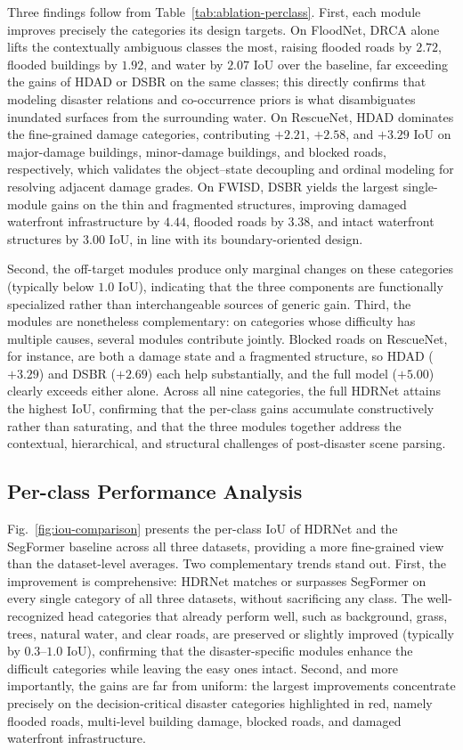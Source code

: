 \documentclass[lettersize,journal]{IEEEtran}
\begin{document}
Three findings follow from Table~\ref{tab:ablation-perclass}. First, each module improves precisely the categories its design targets. On FloodNet, DRCA alone lifts the contextually ambiguous classes the most, raising flooded roads by $2.72$, flooded buildings by $1.92$, and water by $2.07$ IoU over the baseline, far exceeding the gains of HDAD or DSBR on the same classes; this directly confirms that modeling disaster relations and co-occurrence priors is what disambiguates inundated surfaces from the surrounding water. On RescueNet, HDAD dominates the fine-grained damage categories, contributing $+2.21$, $+2.58$, and $+3.29$ IoU on major-damage buildings, minor-damage buildings, and blocked roads, respectively, which validates the object--state decoupling and ordinal modeling for resolving adjacent damage grades. On FWISD, DSBR yields the largest single-module gains on the thin and fragmented structures, improving damaged waterfront infrastructure by $4.44$, flooded roads by $3.38$, and intact waterfront structures by $3.00$ IoU, in line with its boundary-oriented design.

Second, the off-target modules produce only marginal changes on these categories (typically below $1.0$ IoU), indicating that the three components are functionally specialized rather than interchangeable sources of generic gain. Third, the modules are nonetheless complementary: on categories whose difficulty has multiple causes, several modules contribute jointly. Blocked roads on RescueNet, for instance, are both a damage state and a fragmented structure, so HDAD ($+3.29$) and DSBR ($+2.69$) each help substantially, and the full model ($+5.00$) clearly exceeds either alone. Across all nine categories, the full HDRNet attains the highest IoU, confirming that the per-class gains accumulate constructively rather than saturating, and that the three modules together address the contextual, hierarchical, and structural challenges of post-disaster scene parsing.

\subsection{Per-class Performance Analysis}
Fig.~\ref{fig:iou-comparison} presents the per-class IoU of HDRNet and the SegFormer baseline across all three datasets, providing a more fine-grained view than the dataset-level averages. Two complementary trends stand out. First, the improvement is comprehensive: HDRNet matches or surpasses SegFormer on every single category of all three datasets, without sacrificing any class. The well-recognized head categories that already perform well, such as background, grass, trees, natural water, and clear roads, are preserved or slightly improved (typically by $0.3$--$1.0$ IoU), confirming that the disaster-specific modules enhance the difficult categories while leaving the easy ones intact. Second, and more importantly, the gains are far from uniform: the largest improvements concentrate precisely on the decision-critical disaster categories highlighted in red, namely flooded roads, multi-level building damage, blocked roads, and damaged waterfront infrastructure.
\end{document}
